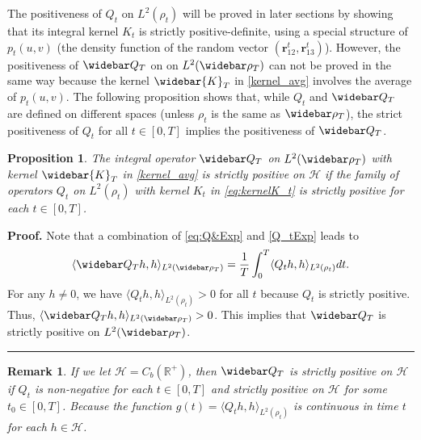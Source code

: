 \documentclass[]{elsarticle}
\def\R{\mathbb{R}}
\newcommand{\wbar}\widebar
\newcommand{\mbf}[1]{\boldsymbol{#1}}
\newcommand{\br}{\mbf{r}}
\newcommand{\hypspace}{\mathcal{H}}
\newtheorem{proposition}[theorem]{Proposition}
\newtheorem{remark}[theorem]{Remark}
\newenvironment{proof}[1][Proof]{\noindent\textbf{#1.} }{\ \rule{0.5em}{0.5em}}
\numberwithin{equation}{section}
\numberwithin{theorem}{section}
\begin{document}


\bigskip


The positiveness of $Q_t$ on $L^2(\rho_t)$ will be proved in later sections by showing that its integral kernel $K_t$ is strictly positive-definite, using a special structure of $p_t(u,v)$ (the density function of the random vector $(\br_{12}^t, \br_{13}^t)$). However, the positiveness of $\wbar Q_T$ on on $L^2(\wbar \rho_T)$ can not be proved in the same way because the kernel $\widebar{K}_T$ in \eqref{kernel_avg} involves the average of $p_t(u,v)$. 
The following proposition shows that, while $Q_t$ and $\wbar Q_T$ are defined on different spaces (unless $\rho_t$ is the same as $\wbar\rho_T$), the strict positiveness of $Q_t$ for all $t\in [0,T]$ implies the positiveness of $\wbar Q_T$.  

\begin{proposition}\label{prop:Qavg_Qt} 
The integral operator $\wbar Q_T$ on $L^2(\wbar\rho_T)$ with  kernel $\widebar{K}_T$ in  \eqref{kernel_avg}  is strictly positive on $\hypspace$
if the family of operators $ Q_t$ on $L^2(\rho_t)$  with kernel $K_t$ in \eqref{eq:kernelK_t} is strictly positive for each $t\in [0,T]$. 
\end{proposition}
\begin{proof} Note that a combination of \eqref{eq:Q&Exp}  and \eqref{Q_tExp} leads to  
\[ \langle \wbar Q_T  h, h\rangle_{L^2(\wbar\rho_T)}  = \frac{1}{T} \int_0^T \langle Q_t h, h\rangle_{L^2(\rho_t)} dt. \]
For any $ h\neq 0$, we have $ \langle Q_t h, h\rangle_{L^2(\rho_t)}>0$ for all $t$ because $Q_t$ is strictly positive. Thus, $\langle \wbar Q_T  h, h\rangle_{L^2(\wbar\rho_T)} >0$. This implies that $\wbar Q_T$ is strictly positive on $L^2(\wbar\rho_T)$. 
\end{proof}

\begin{remark}
If we let $\hypspace=C_b(\R^+)$, then $\wbar Q_T$ is strictly positive on $\hypspace$ if $ Q_t$  is non-negative for each $t\in [0,T]$ and strictly positive on $\hypspace$ for some $t_0\in [0,T]$. Because the function $ g(t) = \langle Q_t h, h\rangle_{L^2(\rho_t)}$ is continuous in time $t$ for each $h\in \hypspace$. 
\end{remark}
\end{document}
